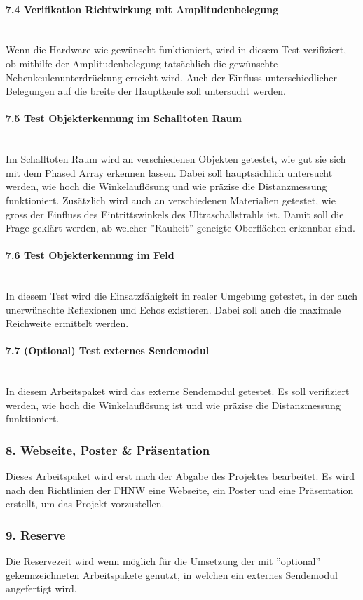 \documentclass[10pt,a4paper,oneside]{99_fhnwreport}
\begin{document}
\paragraph{7.4 Verifikation Richtwirkung mit Amplitudenbelegung}\\
Wenn die Hardware wie gewünscht funktioniert, wird in diesem Test verifiziert, ob mithilfe der Amplitudenbelegung tatsächlich die gewünschte Nebenkeulenunterdrückung erreicht wird. Auch der Einfluss unterschiedlicher Belegungen auf die breite der Hauptkeule soll untersucht werden.

\paragraph{7.5 Test Objekterkennung im Schalltoten Raum}\\
Im Schalltoten Raum wird an verschiedenen Objekten getestet, wie gut sie sich mit dem Phased Array erkennen lassen. Dabei soll hauptsächlich untersucht werden, wie hoch die Winkelauflösung und wie präzise die Distanzmessung funktioniert. Zusätzlich wird auch an verschiedenen Materialien getestet, wie gross der Einfluss des Eintrittswinkels des Ultraschallstrahls ist. Damit soll die Frage geklärt werden, ab welcher ''Rauheit'' geneigte Oberflächen erkennbar sind.

\paragraph{7.6 Test Objekterkennung im Feld}\\
In diesem Test wird die Einsatzfähigkeit in realer Umgebung getestet, in der auch unerwünschte Reflexionen und Echos existieren. Dabei soll auch die maximale Reichweite ermittelt werden.

\paragraph{7.7 (Optional) Test externes Sendemodul}\\
In diesem Arbeitspaket wird das externe Sendemodul getestet. Es soll verifiziert werden, wie hoch die Winkelauflösung ist und wie präzise die Distanzmessung funktioniert.

\subsubsection*{8. Webseite, Poster \& Präsentation}
Dieses Arbeitspaket wird erst nach der Abgabe des Projektes bearbeitet. Es wird nach den Richtlinien der FHNW eine Webseite, ein Poster und eine Präsentation erstellt, um das Projekt vorzustellen.

\subsubsection*{9. Reserve}
Die Reservezeit wird wenn möglich für die Umsetzung der mit ''optional'' gekennzeichneten Arbeitspakete genutzt, in welchen ein externes Sendemodul angefertigt wird.
\end{document}
